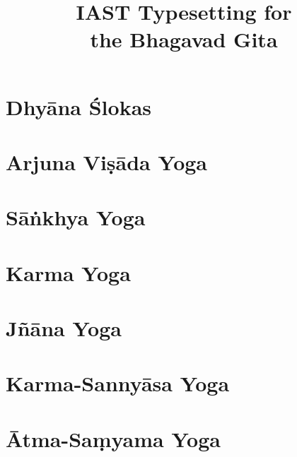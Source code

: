 \documentclass{scrbook}
\title{IAST Typesetting for \\ the Bhagavad Gita}
\author{}
\begin{document}
\maketitle
\frontmatter

\tableofcontents
\newpage

\chapter{Dhyāna Ślokas}


\mainmatter
\chapter{Arjuna Viṣāda Yoga}
\begin{multicols}{2}
    
\end{multicols}

\chapter{Sāṅkhya Yoga}
\begin{multicols}{2}
    
\end{multicols}

\chapter{Karma Yoga}
\begin{multicols}{2}
    
\end{multicols}

\chapter{Jñāna Yoga}
\begin{multicols}{2}
    
\end{multicols}

\chapter{Karma-Sannyāsa Yoga}
\begin{multicols}{2}
    
\end{multicols}

\chapter{Ātma-Saṃyama Yoga}
\begin{multicols}{2}
    
\end{multicols}
\end{document}
